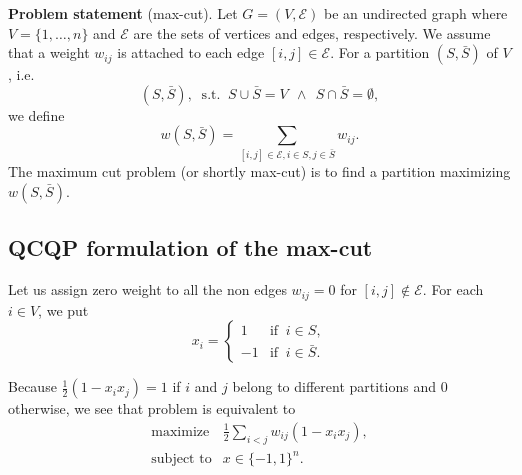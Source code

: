\documentclass[12pt]{book}
\theoremstyle{definition}
\begin{document}
{\bf Problem statement} (max-cut).
Let $G = (V, \mathcal{E} )$ be an undirected graph where $V = \{1, \dots , n\}$ and $\mathcal{E}$ are the sets of vertices
and edges, respectively. We assume that a weight $w_{ij}$ is attached to each edge $[i, j] \in \mathcal{E}$.
For a partition $(S, \bar{S})$ of $V$, i.e. 
\begin{equation}
(S, \bar{S}), \ \mbox{ s.t. } \ S \cup \bar{S} = V \ \ \wedge \ \ S\cap \bar{S} = \emptyset,
\end{equation}
 we define
\begin{equation}
w(S,\bar{S}) = \sum_{[i,j]\in\mathcal{E}, i\in S, j\in \bar{S}} w_{ij}.
\end{equation}
The maximum cut problem (or shortly max-cut) is to find a partition maximizing $w(S,\bar{S})$.

\subsection{QCQP formulation of the max-cut}
Let us assign zero weight to all the non edges $w_{ij} = 0$ for $[i,j]\notin \mathcal{E}$.
For each $i \in V$, we put
\begin{equation}
x_i = \left\lbrace \begin{array}{rl}
1 & \mbox{if } \ i \in S, \\
-1 & \mbox{if } \ i \in \bar{S}.
\end{array}\right.
\end{equation}

Because $\frac{1}{2}(1-x_ix_j ) = 1$ if $i$ and $j$ belong to different partitions and 0 otherwise, we see that
problem is equivalent to 
\begin{equation}
\label{maxcut2}
\begin{array}{ll}
\mbox{maximize} & \frac{1}{2}\sum_{i<j}w_{ij}(1-x_ix_j ), \\
\mbox{subject to} &  x \in \{-1,1\}^n.
\end{array}
\end{equation}
\end{document}
